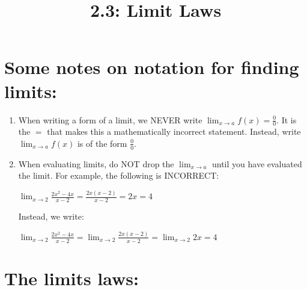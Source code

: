 \documentclass[nooutcomes]{ximera}
\title{2.3:  Limit Laws}
\begin{document}
\begin{abstract}		\end{abstract}
\maketitle

\section{Some notes on notation for finding limits:}
\begin{enumerate}
	\item When writing a form of a limit, we NEVER write $\lim_{x \to a}f(x)=\frac{0}{0}$.  It is the $=$ that makes this a mathematically incorrect statement.  Instead, write $\lim_{x \to a}f(x)$ is of the form $\frac{0}{0}$.

	\item When evaluating limits, do NOT drop the $\lim_{x \to a}$ until you have evaluated the limit.  For example, the following is INCORRECT:
	\begin{center}
	$\lim_{x \to 2}\frac{2x^2-4x}{x-2}=\frac{2x(x-2)}{x-2}=2x=4$\\	
	\end{center}

	Instead, we write: 
		\begin{center}
	$\lim_{x \to 2}\frac{2x^2-4x}{x-2}=\lim_{x \to 2}\frac{2x(x-2)}{x-2}=\lim_{x \to 2}2x=4$\\	
	\end{center}

\end{enumerate}

 \section{The limits laws:}
  
\end{document}
